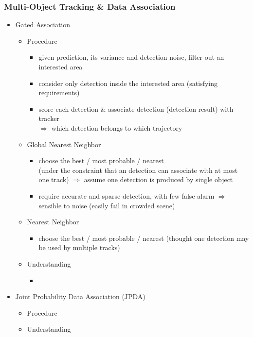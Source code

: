 \subsubsection{Multi-Object Tracking \& Data Association}
\begin{itemize}
\item Gated Association
	\begin{itemize}
	\item Procedure
		\begin{itemize}
		\item given prediction, its variance and detection noise, filter out an interested area
		\item consider only detection inside the interested area (satisfying requirements)
		\item score each detection \& associate detection (detection result) with tracker \\
		$\Rightarrow$ which detection belongs to which trajectory
		\end{itemize}
	\item Global Nearest Neighbor
		\begin{itemize}
		\item choose the best / most probable / nearest \\
		(under the constraint that an detection can associate with at most one track)
		$\Rightarrow$ assume one detection is produced by single object
		\item require accurate and sparse detection, with few false alarm
		$\Rightarrow$ sensible to noise (easily fail in crowded scene)
		\end{itemize}
	\item Nearest Neighbor
		\begin{itemize}
		\item choose the best / most probable / nearest
		(thought one detection may be used by multiple tracks)
		\end{itemize}
	\item Understanding
		\begin{itemize}
		\item 
		\end{itemize}
	\end{itemize}
\item Joint Probability Data Association (JPDA)
	\begin{itemize}
	\item Procedure
	\item Understanding
		\begin{itemize}

\end{itemize}
\end{itemize}
\end{itemize}
